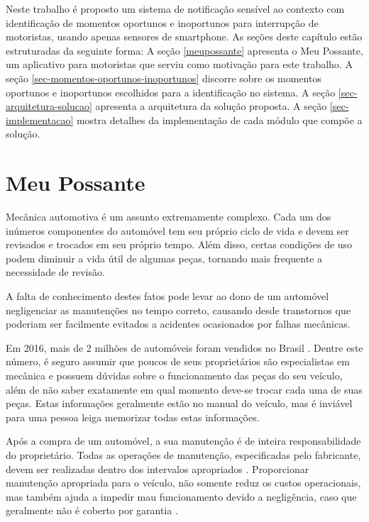 \label{proposta}

Neste trabalho é proposto um sistema de notificação sensível ao contexto com identificação de momentos oportunos e
inoportunos para interrupção de motoristas, usando apenas sensores de smartphone. As seções deste capítulo estão
estruturadas da seguinte forma: A seção \ref{meupossante} apresenta o Meu Possante, um aplicativo para motoristas
que serviu como motivação para este trabalho. A seção \ref{sec-momentos-oportunos-inoportunos} discorre sobre
os momentos oportunos e inoportunos escolhidos para a identificação no sistema. A seção \ref{sec-arquitetura-solucao}
apresenta a arquitetura da solução proposta. A seção \ref{sec-implementacao} mostra detalhes da implementação
de cada módulo que compõe a solução.

\section{Meu Possante}{}
\label{meupossante}
Mecânica automotiva é um assunto extremamente complexo. Cada um dos inúmeros componentes
do automóvel tem seu próprio ciclo de vida e devem ser revisados e trocados em seu próprio
tempo. Além disso, certas condições de uso podem diminuir a vida útil de algumas peças,
tornando mais frequente a necessidade de revisão.

A falta de conhecimento destes fatos pode levar ao dono de um automóvel negligenciar
as manutenções no tempo correto, causando desde transtornos que poderiam ser facilmente
evitados a acidentes ocasionados por falhas mecânicas.

Em 2016, mais de 2 milhões de automóveis foram vendidos no Brasil
\cite{fenabrave}. Dentre este número, é seguro assumir que poucos de seus
proprietários são especialistas em mecânica e possuem dúvidas sobre o
funcionamento das peças do seu veículo, além de não saber exatamente em qual
momento deve-se trocar cada uma de suas peças. Estas informações geralmente
estão no manual do veículo, mas é inviável para uma pessoa leiga memorizar
todas estas informações.

Após a compra de um automóvel, a sua manutenção é de inteira responsabilidade
do proprietário. Todas as operações de manutenção, especificadas pelo fabricante,
devem ser realizadas dentro dos intervalos apropriados \cite{manualhyundai}.
Proporcionar manutenção apropriada para o veículo, não somente reduz os custos
operacionais, mas também ajuda a impedir mau funcionamento devido a negligência,
caso que geralmente não é coberto por garantia \cite{manualonix}.


